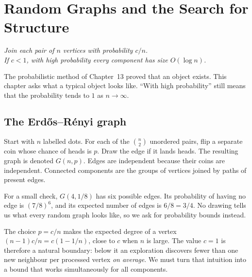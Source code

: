 \chapter{Random Graphs and the Search for Structure}

\begin{center}\itshape
Join each pair of $n$ vertices with probability $c/n$.\\
If $c<1$, with high probability every component has size $O(\log n)$.
\end{center}

The probabilistic method of Chapter~13 proved that an object exists. This chapter asks what a typical object looks like. ``With high probability'' still means that the probability tends to $1$ as $n\to\infty$.

\section{The Erd\H os--R\'enyi graph}

Start with $n$ labelled dots. For each of the $\binom n2$ unordered pairs, flip a separate coin whose chance of heads is $p$. Draw the edge if it lands heads. The resulting graph is denoted $G(n,p)$. Edges are independent because their coins are independent. Connected components are the groups of vertices joined by paths of present edges.

For a small check, $G(4,1/8)$ has six possible edges. Its probability of having no edge is $(7/8)^6$, and its expected number of edges is $6/8=3/4$. No drawing tells us what every random graph looks like, so we ask for probability bounds instead.

The choice $p=c/n$ makes the expected degree of a vertex $(n-1)c/n=c(1-1/n)$, close to $c$ when $n$ is large. The value $c=1$ is therefore a natural boundary: below it an exploration discovers fewer than one new neighbour per processed vertex \emph{on average}. We must turn that intuition into a bound that works simultaneously for all components.

